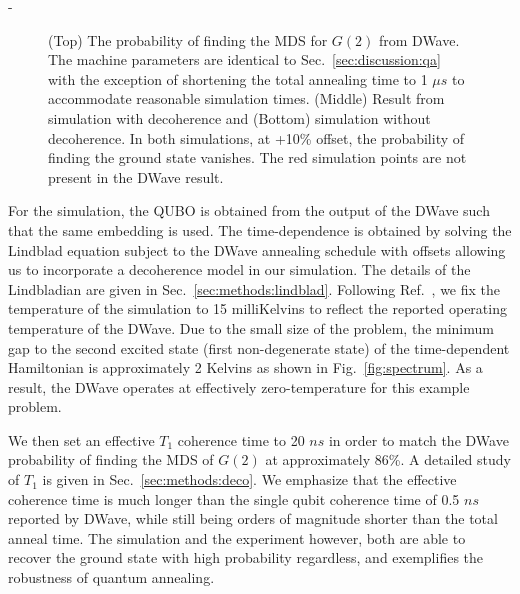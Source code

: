 -\documentclass[prd,twocolumn,tightenlines,preprintnumbers,showpacs,superscriptaddress,notitlepage,nofootinbib,eqsecnum,floatfix,longbibliography]{revtex4}
\begin{document}
\begin{figure}
    \caption{ (Top) The probability of finding the MDS for $G(2)$ from DWave.
The machine parameters are identical to Sec.~\ref{sec:discussion:qa} with the exception of shortening the total annealing time to 1 $\mu s$ to accommodate reasonable simulation times.
(Middle) Result from simulation with decoherence and (Bottom) simulation without decoherence.
In both simulations, at +10\% offset, the probability of finding the ground state vanishes.
The red simulation points are not present in the DWave result.}
    \label{fig:dwave1us}
\end{figure}

For the simulation, the QUBO is obtained from the output of the DWave such that the same embedding is used.
The time-dependence is obtained by solving the Lindblad equation subject to the DWave annealing schedule with offsets allowing us to incorporate a decoherence model in our simulation.
The details of the Lindbladian are given in Sec.~\ref{sec:methods:lindblad}.
Following Ref.~\cite{}, we fix the temperature of the simulation to 15 milliKelvins to reflect the reported operating temperature of the DWave.
Due to the small size of the problem, the minimum gap to the second excited state (first non-degenerate state) of the time-dependent Hamiltonian is approximately 2 Kelvins as shown in Fig.~\ref{fig:spectrum}.
As a result, the DWave operates at effectively zero-temperature for this example problem.

We then set an effective $T_1$ coherence time to 20 $ns$ in order to match the DWave probability of finding the MDS of $G(2)$ at approximately 86\%.
A detailed study of $T_1$ is given in Sec.~\ref{sec:methods:deco}.
We emphasize that the effective coherence time is much longer than the single qubit coherence time of 0.5 $ns$ reported by DWave, while still being orders of magnitude shorter than the total anneal time.
The simulation and the experiment however, both are able to recover the ground state with high probability regardless, and exemplifies the robustness of quantum annealing.
\end{document}
